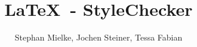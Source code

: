 \documentclass[hyperref={bookmarksopen=false}]{beamer}
\title{\LaTeX~- StyleChecker}
\author[Stephan Mielke, Jochen Steiner, Tessa Fabian]{Stephan Mielke, Jochen Steiner, Tessa Fabian}
\institute[TU Braunschweig, IPS]{Technische Universität Braunschweig, IPS}
\makeatletter
\def\beamer@writeslidentry@miniframesoff{
  \expandafter\beamer@ifempty\expandafter{\beamer@framestartpage}{}
  {
    \clearpage\beamer@notesactions
  }
}
\newcommand*{\miniframesoff}{\let\beamer@writeslidentry=\beamer@writeslidentry@miniframesoff}
\makeatother
\begin{document}
\miniframesoff
\begin{frame}[plain]
\titlepage
\end{frame}



\end{document}
